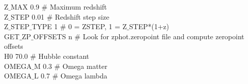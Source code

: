 \begin{tt}
Z$\_$MAX                0.9                $\#$ Maximum redshift\\
Z$\_$STEP               0.01               $\#$ Redshift step size\\
Z$\_$STEP$\_$TYPE          1                  $\#$  0 = ZSTEP, 1 = Z$\_$STEP*(1+z)\\
GET$\_$ZP$\_$OFFSETS       n                  $\#$ Look for zphot.zeropoint file and compute zeropoint offsets\\
H0                   70.0               $\#$  Hubble constant\\
OMEGA$\_$M              0.3                $\#$ Omega matter\\
OMEGA$\_$L              0.7                $\#$ Omega lambda\\
\end{tt}

